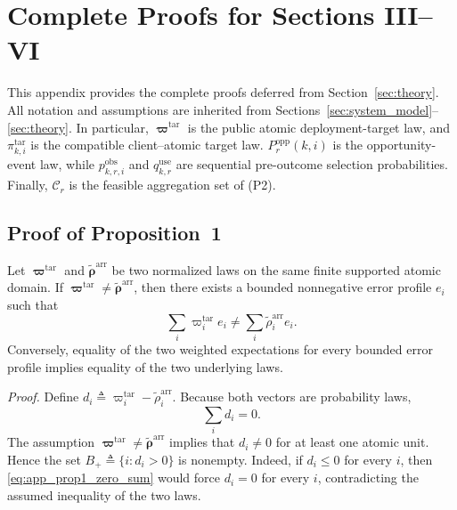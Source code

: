 \appendices
\section{Complete Proofs for Sections III--VI}
\label{app:complete_proofs}

This appendix provides the complete proofs deferred from
Section~\ref{sec:theory}.  All notation and assumptions are inherited from
Sections~\ref{sec:system_model}--\ref{sec:theory}.  In particular,
$\boldsymbol\varpi^{\mathrm{tar}}$ is the public atomic deployment-target law,
and $\pi^{\mathrm{tar}}_{k,i}$ is the compatible client--atomic target law.
$P_r^{\mathrm{opp}}(k,i)$ is the opportunity-event law, while
$p^{\mathrm{obs}}_{k,r,i}$ and $q^{\mathrm{use}}_{k,r}$ are sequential
pre-outcome selection probabilities.  Finally, $\mathcal{C}_r$ is the feasible
aggregation set of (P2).

\subsection{Proof of Proposition~1}
\label{app:proof_prop1}

\begin{proposition*}
Let $\boldsymbol\varpi^{\mathrm{tar}}$ and
$\widetilde{\boldsymbol\rho}^{\mathrm{arr}}$ be two normalized laws on the same
finite supported atomic domain.  If
$\boldsymbol\varpi^{\mathrm{tar}}\neq
\widetilde{\boldsymbol\rho}^{\mathrm{arr}}$, then there exists a bounded
nonnegative error profile $e_i$ such that
\begin{equation}
    \sum_i \varpi_i^{\mathrm{tar}}e_i
    \neq
    \sum_i \widetilde\rho_i^{\mathrm{arr}}e_i.
    \label{eq:app_prop1_claim}
\end{equation}
Conversely, equality of the two weighted expectations for every bounded error
profile implies equality of the two underlying laws.
\end{proposition*}

\noindent\emph{Proof.}
Define $d_i\triangleq\varpi_i^{\mathrm{tar}}-\widetilde\rho_i^{\mathrm{arr}}$.
Because both vectors are probability laws,
\begin{equation}
    \sum_i d_i=0.
    \label{eq:app_prop1_zero_sum}
\end{equation}
The assumption
$\boldsymbol\varpi^{\mathrm{tar}}\neq
\widetilde{\boldsymbol\rho}^{\mathrm{arr}}$
implies that $d_i\neq0$ for at least one atomic unit.  Hence the set
$B_+\triangleq\{i:d_i>0\}$
is nonempty.  Indeed, if $d_i\le0$ for every $i$, then
\eqref{eq:app_prop1_zero_sum} would force $d_i=0$ for every $i$, contradicting
the assumed inequality of the two laws.

